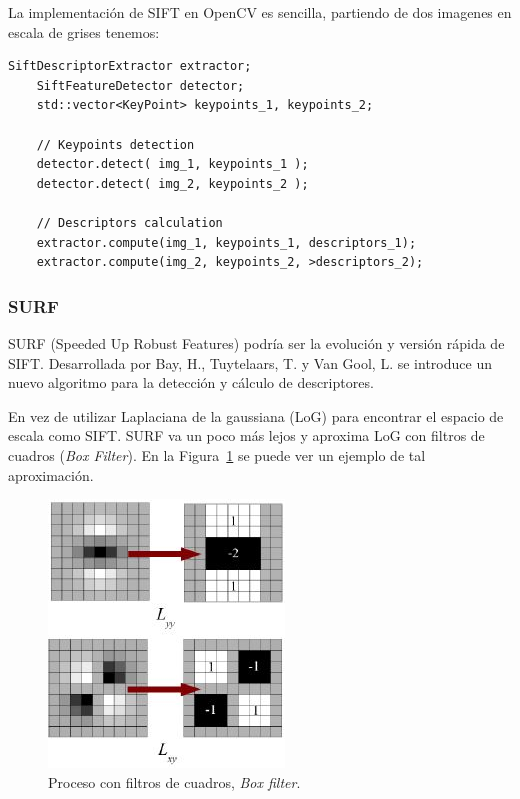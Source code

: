 La implementación de SIFT en OpenCV es sencilla, partiendo de dos imagenes en escala de grises tenemos:

\begin{lstlisting}[style=CStyle]
	SiftDescriptorExtractor extractor;
 	SiftFeatureDetector detector;
 	std::vector<KeyPoint> keypoints_1, keypoints_2;

	// Keypoints detection
 	detector.detect( img_1, keypoints_1 );
 	detector.detect( img_2, keypoints_2 );
  	
 	// Descriptors calculation
 	extractor.compute(img_1, keypoints_1, descriptors_1);
 	extractor.compute(img_2, keypoints_2, >descriptors_2);
\end{lstlisting}

\subsubsection{SURF}

SURF (Speeded Up Robust Features) podría ser la evolución y versión rápida de SIFT. Desarrollada por Bay, H., Tuytelaars, T. y Van Gool, L. \parencite{Reference12} se introduce un nuevo algoritmo para la detección y cálculo de descriptores.

En vez de utilizar Laplaciana de la gaussiana (LoG) para encontrar el espacio de escala como SIFT. SURF va un poco más lejos y aproxima LoG con filtros de cuadros (\textit{Box Filter}). En la Figura~\ref{fig:surf1} se puede ver un ejemplo de tal aproximación.

\begin{figure}[ht]
\centering
\includegraphics[scale=0.6]{Figures/surf-1.jpg}
\decoRule
\caption[Ejemplo de \textit{Box filter} en SURF]{Proceso con filtros de cuadros, \textit{Box filter}.}
\label{fig:surf1}
\end{figure}


